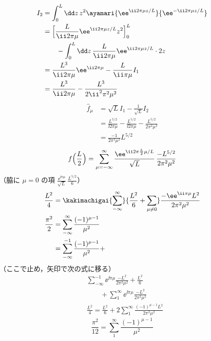 \begin{align*}
  I_2&=\int_{0}^{L}\dd z\,z^{2}\ayamari{\ee^{\ii2\pi\mu z/L}}{\ee^{-\ii2\pi\mu z/L}}\\
  &=\Bigl[\frac{L}{\ii2\pi\mu}\ee^{\ii2\pi\mu z/L}z^{2}\Bigr]_{0}^{L}\\
  &\qquad-\int_{0}^{L}\dd z\,\frac{L}{\ii2\pi\mu}\ee^{\ii2\pi\mu z/L}\cdot2z\\
  &=\frac{L^{3}}{\ii2\pi\mu}\ee^{\ii2\pi\mu}-\frac{L}{\ii\pi\mu}I_1\\
  &=\frac{L^{3}}{\ii2\pi\mu}-\frac{L^{3}}{2\ii^{2}\pi^{2}\mu^{2}}
\end{align*}
\begin{align*}
  \hat{f}_{\mu}&=\sqrt{L}I_1-\frac{1}{\sqrt{L}}I_2\\
  &=\frac{L^{5/2}}{\ii2\pi\mu}-\frac{L^{5/2}}{\ii2\pi\mu}-\frac{L^{5/2}}{2\pi^{2}\mu^{2}}\\
  &=\frac{-1}{2\pi^{2}\mu^{2}}L^{5/2}
\end{align*}
\[
  f\Bigl(\frac{L}{2}\Bigr)=\sum_{\mu=-\infty}^{\infty}\frac{\ee^{\ii2\pi\frac{L}{2}\mu/L}}{\sqrt{L}}\,\frac{-L^{5/2}}{2\pi^{2}\mu^{2}}
\]
（脇に $\mu=0$ の項 $\frac{\ee^{\ii\pi\mu}}{\sqrt{L}}\,\frac{L^{5/2}}{6}$）
\begin{align*}
  \frac{L^{2}}{4}&=\kakimachigai{\sum_{-\infty}^{\infty}}{\frac{L^{2}}{6}+\sum_{\mu\neq0}}\frac{-\ee^{\ii\pi\mu}L^{2}}{2\pi^{2}\mu^{2}}\\
  \frac{\pi^{2}}{2}&=\sum_{-\infty}^{\infty}\frac{(-1)^{\mu-1}}{\mu^{2}}\\
  &=\sum_{-\infty}^{-1}\frac{(-1)^{\mu-1}}{\mu^{2}}+
\end{align*}
（ここで止め，矢印で次の式に移る）
\begin{align*}
  &\sum_{-\infty}^{-1}\ee^{\ii\pi\mu}\frac{-L^{2}}{2\pi^{2}\mu^{2}}+\frac{L^{2}}{6}\\
  &\qquad+\sum_{1}^{\infty}\ee^{\ii\pi\mu}\frac{-L^{2}}{2\pi^{2}\mu^{2}}\\
  &\frac{L^{2}}{4}=\frac{L^{2}}{6}+2\sum_{1}^{\infty}\frac{(-1)^{\mu-1}L^{2}}{2\pi^{2}\mu^{2}}
\end{align*}
\[
  \frac{\pi^{2}}{12}=\sum_{1}^{\infty}\frac{(-1)^{\mu-1}}{\mu^{2}}
\]
